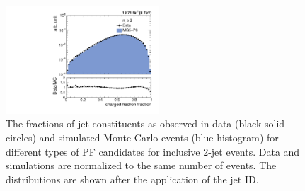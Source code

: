 \begin{figure}[!htbp]
\begin{center}
 \vspace*{1mm}
 \includegraphics[width=0.51\textwidth]{Plots_HT_2_150/Comparison_ChHadFrac_2_HT_2_150.pdf}
 \caption[The fractions of jet constituents for different types of PF candidates for inclusive 2-jet events.]{The fractions of jet constituents as observed in data (black solid circles) and simulated Monte Carlo events (blue histogram) for different types of PF candidates for inclusive 2-jet events. Data and simulations are normalized to the same number of events. The distributions are shown after the application of the jet ID.}
 \label{fig:qual2}
 \end{center}
\end{figure} 


